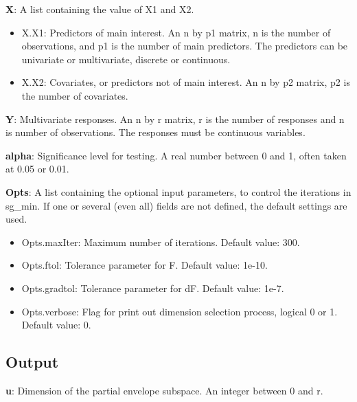 \documentclass[a4paper,11pt,openany]{memoir}
\begin{document}
\begin{par}
\textbf{X}: A list containing the value of X1 and X2.
\end{par} \vspace{1em}
\begin{itemize}
\setlength{\itemsep}{-1ex}
   \item X.X1: Predictors of main interest. An n by p1 matrix, n is the number of observations, and p1 is the number of main predictors. The predictors can be univariate or multivariate, discrete or continuous.
   \item X.X2: Covariates, or predictors not of main interest.  An n by p2 matrix, p2 is the number of covariates.
\end{itemize}
\begin{par}
\textbf{Y}: Multivariate responses. An n by r matrix, r is the number of responses and n is number of observations. The responses must be continuous variables.
\end{par} \vspace{1em}
\begin{par}
\textbf{alpha}: Significance level for testing.  A real number between 0 and 1, often taken at 0.05 or 0.01.
\end{par} \vspace{1em}
\begin{par}
\textbf{Opts}: A list containing the optional input parameters, to control the iterations in sg\_min. If one or several (even all) fields are not defined, the default settings are used.
\end{par} \vspace{1em}
\begin{itemize}
\setlength{\itemsep}{-1ex}
   \item Opts.maxIter: Maximum number of iterations.  Default value: 300.
   \item Opts.ftol: Tolerance parameter for F.  Default value: 1e-10.
   \item Opts.gradtol: Tolerance parameter for dF.  Default value: 1e-7.
   \item Opts.verbose: Flag for print out dimension selection process, logical 0 or 1. Default value: 0.
\end{itemize}


\subsection*{Output}

\begin{par}
\textbf{u}: Dimension of the partial envelope subspace. An integer between 0 and r.
\end{par} \vspace{1em}
\end{document}
